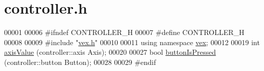 \hypertarget{controller_8h_source}{}\section{controller.\+h}
\label{controller_8h_source}

\begin{DoxyCode}
00001 
00006 \textcolor{preprocessor}{#ifndef CONTROLLER\_H}
00007 \textcolor{preprocessor}{#define CONTROLLER\_H}
00008 
00009 \textcolor{preprocessor}{#include "\mbox{\hyperlink{vex_8h}{vex.h}}"}
00010 
00011 \textcolor{keyword}{using namespace }\mbox{\hyperlink{namespacevex}{vex}};
00012 
00019 \textcolor{keywordtype}{int} \mbox{\hyperlink{controller_8h_a73be3a8649e7d561a68cd816420efbd9_a73be3a8649e7d561a68cd816420efbd9}{axisValue}} (controller::axis Axis);
00020 
00027 \textcolor{keywordtype}{bool} \mbox{\hyperlink{controller_8h_aff3b02388de758f0fe6d98930ea57626_aff3b02388de758f0fe6d98930ea57626}{buttonIsPressed}} (controller::button Button);
00028 
00029 \textcolor{preprocessor}{#endif}
\end{DoxyCode}
